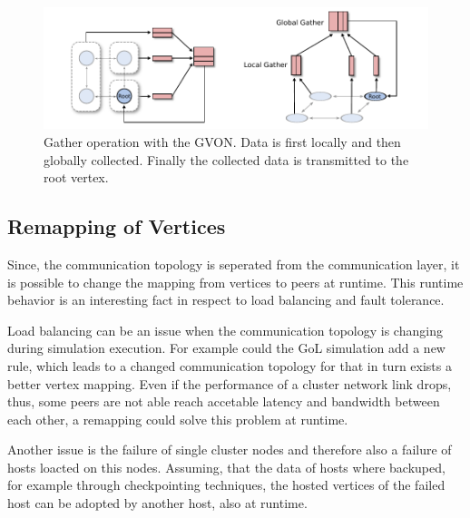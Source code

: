 \begin{figure}[H]
  \centering \includegraphics[width=\textwidth]{graphics/30_gon_collective}
  \caption{Gather operation with the GVON. Data is first locally 
    and then globally collected. Finally the collected data
    is transmitted to the root vertex.}
  \label{fig:gvon_collective}
\end{figure}


\subsection{Remapping of Vertices}
\label{sec:remapping}
Since, the communication topology is seperated from the communication
layer, it is possible to change the mapping from vertices to peers at
runtime. This runtime behavior is an interesting fact in respect to
load balancing and fault tolerance.

Load balancing can be an issue when the communication topology is
changing during simulation execution. For example could the GoL
simulation add a new rule, which leads to a changed communication
topology for that in turn exists a better vertex mapping. Even if the
performance of a cluster network link drops, thus, some peers are not
able reach accetable latency and bandwidth between each other, a
remapping could solve this problem at runtime.


Another issue is the failure of single cluster nodes and therefore
also a failure of hosts loacted on this nodes. Assuming, that the data
of hosts where backuped, for example through checkpointing techniques,
the hosted vertices of the failed host can be adopted by another host,
also at runtime.

